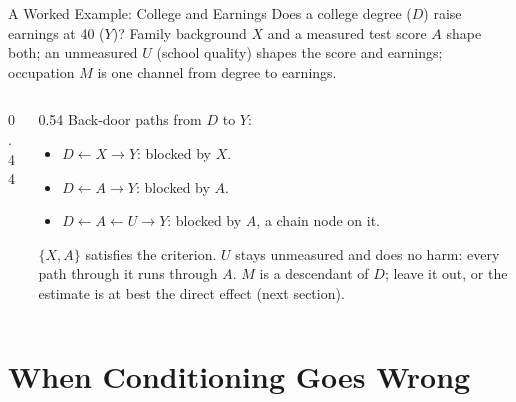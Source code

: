 \documentclass[aspectratio=169,11pt,xcolor=dvipsnames]{beamer}
\begin{document}
\begin{frame}{A Worked Example: College and Earnings}
Does a college degree ($D$) raise earnings at 40 ($Y$)? Family background
$X$ and a measured test score $A$ shape both; an unmeasured $U$ (school
quality) shapes the score and earnings; occupation $M$ is one channel from
degree to earnings.
\begin{columns}[c]
\begin{column}{0.44\textwidth}
\centering
{}
\end{column}
\begin{column}{0.54\textwidth}
Back-door paths from $D$ to $Y$:
\begin{itemize}\itemsep1pt
  \item $D \leftarrow X \to Y$: blocked by $X$.
  \item $D \leftarrow A \to Y$: blocked by $A$.
  \item $D \leftarrow A \leftarrow U \to Y$: blocked by $A$, a chain node
        on it.
\end{itemize}
$\{X, A\}$ satisfies the criterion. $U$ stays unmeasured and does no harm:
every path through it runs through $A$. $M$ is a descendant of $D$; leave it
out, or the estimate is at best the direct effect (next section).
\end{column}
\end{columns}
\end{frame}

\section[Colliders]{When Conditioning Goes Wrong}
\begin{frame}\sectionpage\end{frame}
\end{document}
